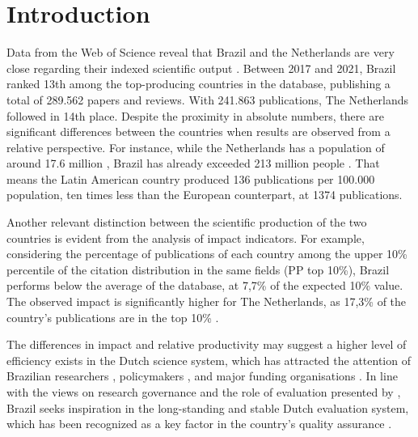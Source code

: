 \section{Introduction}
\label{sec:multi:intro}

Data from the Web of Science reveal that Brazil and the Netherlands are very close regarding their indexed scientific output \autocite{Clarivate.2022}. Between 2017 and 2021, Brazil ranked 13th among the top-producing countries in the database, publishing a total of 289.562 papers and reviews. With 241.863 publications, The Netherlands followed in 14th place. Despite the proximity in absolute numbers, there are significant differences between the countries when results are observed from a relative perspective. For instance, while the Netherlands has a population of around 17.6 million \autocite{CBS.2021}, Brazil has already exceeded 213 million people \autocite{IBGE.2021}. That means the Latin American country produced 136 publications per 100.000 population, ten times less than the European counterpart, at 1374 publications. 

Another relevant distinction between the scientific production of the two countries is evident from the analysis of impact indicators. For example, considering the percentage of publications of each country among the upper 10\% percentile of the citation distribution in the same ﬁelds (PP top 10\%), Brazil performs below the average of the database, at 7,7\% of the expected 10\% value. The observed impact is significantly higher for The Netherlands, as 17,3\% of the country’s publications are in the top 10\% \autocite[see][]{Bornmann.2014}.

The differences in impact and relative productivity may suggest a higher level of efficiency exists in the Dutch science system, which has attracted the attention of Brazilian researchers \autocite[e.g.,][]{Marcovitch.2018, Verhine.2012}, policymakers \autocite[e.g.,][]{Barbosa.2020b}, and major funding organisations \autocite[e.g.,][]{CAPES.2018sc, Capes.2018sp}. In line with the views on research governance and the role of evaluation presented by \textcite{Molas-Gallart.2012}, Brazil seeks inspiration in the long-standing and stable Dutch evaluation system, which has been recognized as a key factor in the country’s quality assurance \autocite[17]{Drooge.2013}. 

